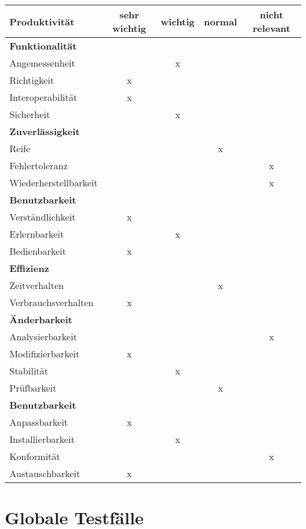 \documentclass[parskip=full,11pt]{scrartcl}
\begin{document}
\renewcommand{\arraystretch}{1.5}
\begin{table}[H]
  \begin{center}
    \begin{tabularx}{\textwidth}{X c c c c}
      \hline
      
      \textbf{{\large Produktivität}} & \textbf{{\large sehr wichtig}} & \textbf{{\large wichtig}} & \textbf{{\large normal} } &\textbf{{\large nicht relevant }}\\
      
      \hline      
      \multicolumn{5}{l}{\textbf{Funktionalität}}\\      
      \hline      
      Angemessenheit &   & x &   &  \\
	  Richtigkeit & x &   &   &  \\
	  Interoperabilität & x &   &   &  \\
      Sicherheit &   & x &   &  \\	
		    
	  \hline	  
      \multicolumn{5}{l}{\textbf{Zuverlässigkeit}}\\     
      \hline
      Reife &   &   & x &  \\
	  Fehlertoleranz &   &   &   & x\\
	  Wiederherstellbarkeit &   &   &   & x\\
		
	  \hline	  	
	  \multicolumn{5}{l}{\textbf{Benutzbarkeit}}\\
      \hline
      Verständlichkeit & x &   &   &  \\
	  Erlernbarkeit &   & x &   &  \\
	  Bedienbarkeit & x &   &   &  \\
	  
	  \hline	  	
	  \multicolumn{5}{l}{\textbf{Effizienz}}\\
      \hline
      Zeitverhalten &   &   & x &  \\
	  Verbrauchsverhalten & x &   &   &  \\	
	  
	  \hline	  	
	  \multicolumn{5}{l}{\textbf{Änderbarkeit}}\\
      \hline
      Analysierbarkeit &   &   &   & x\\
	  Modifizierbarkeit & x &   &   &  \\
	  Stabilität &   & x &   &  \\
	  Prüfbarkeit &   &   & x &  \\
	  
	  \hline	  	
	  \multicolumn{5}{l}{\textbf{Benutzbarkeit}}\\
      \hline
      Anpassbarkeit & x &  &  & \\
	  Installierbarkeit &   & x  &   & \\
	  Konformität &   &  &   & x \\
	  Austauschbarkeit &  x &   &   &  \\
	  
	  \hline      			
    \end{tabularx}
  \end{center}
  
\end{table}
\renewcommand{\arraystretch}{1}
\section{Globale Testfälle}

\newpage
\printglossary	
\end{document}
